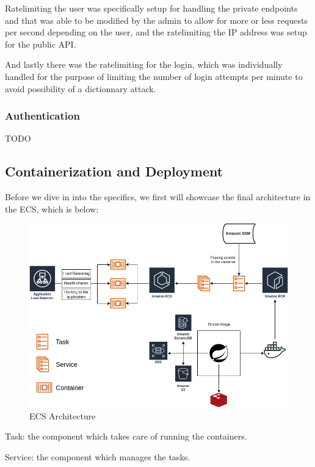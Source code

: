 Ratelimiting the user was specifically setup for handling the private endpoints and that
was able to be modified by the admin to allow for more or less requests per second
depending on the user, and the ratelimiting the IP address was setup for the public API.

And lastly there was the ratelimiting for the login, which was individually handled for
the purpose of limiting the number of login attempts per minute to avoid possibility
of a dictionnary attack.

\subsubsection {Authentication}

TODO

\newpage

\subsection {Containerization and Deployment}

Before we dive in into the specifics, we first will showcase the final architecture in the ECS, which is below:

\begin{figure}[!htbp]
    \centering
    \includegraphics[width=\textwidth]{images/ECS}
    \caption{\footnotesize{ECS Architecture}}
    \label{fig:ECSArch}
\end{figure}

Task: the component which takes care of running the containers.

Service: the component which manages the tasks.

